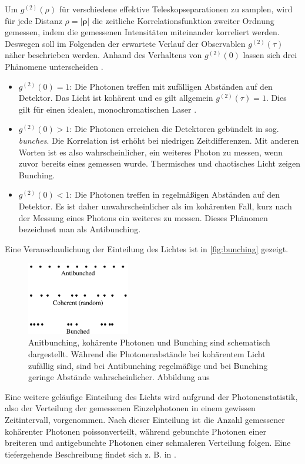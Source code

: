 Um $g^{(2)}(\rho)$ für verschiedene effektive Teleskopseparationen zu samplen, wird für jede Distanz $\rho=|\bm{\rho}|$ die zeitliche Korrelationsfunktion zweiter Ordnung gemessen, indem die gemessenen Intensitäten miteinander korreliert werden. 
Deswegen soll im Folgenden der erwartete Verlauf der Observablen $g^{(2)}(\tau)$ näher beschrieben werden. 
Anhand des Verhaltens von $g^{(2)}(0)$ lassen sich drei Phänomene unterscheiden \cite{foxQuantumOpticsIntroduction2006}. 
\begin{itemize}
    \item $g^{(2)}(0)=1$: Die Photonen treffen mit zufälligen Abständen auf den Detektor. Das Licht ist kohärent und es gilt allgemein $g^{(2)}(\tau)=1$. Dies gilt für einen idealen, monochromatischen Laser \cite[Kap. 9]{mansuripurClassicalOpticsIts2009}.
    \item $g^{(2)}(0)>1$: Die Photonen erreichen die Detektoren gebündelt in sog. \emph{bunches}. Die Korrelation ist erhöht bei niedrigen Zeitdifferenzen. Mit anderen Worten ist es also wahrscheinlicher, ein weiteres Photon zu messen, wenn zuvor bereits eines gemessen wurde. Thermisches und chaotisches Licht zeigen Bunching.
    \item $g^{(2)}(0)<1$: Die Photonen treffen in regelmäßigen Abständen auf den Detektor. Es ist daher unwahrscheinlicher als im kohärenten Fall, kurz nach der Messung eines Photons ein weiteres zu messen. Dieses Phänomen bezeichnet man als Antibunching. 
\end{itemize}
Eine Veranschaulichung der Einteilung des Lichtes ist in \autoref{fig:bunching} gezeigt. 
\begin{figure}[h]
    \centering
    \includegraphics[width=0.4\textwidth]{images/Theorie/Fox_6.6.png}
    \caption{Anitbunching, kohärente Photonen und Bunching sind schematisch dargestellt. Während die Photonenabstände bei kohärentem Licht zufällig sind, sind bei Antibunching regelmäßige und bei Bunching geringe Abstände wahrscheinlicher. Abbildung aus \cite[Abb. 6.6]{foxQuantumOpticsIntroduction2006}}
    \label{fig:bunching}
\end{figure}
Eine weitere geläufige Einteilung des Lichts wird aufgrund der Photonenstatistik, also der Verteilung der gemessenen Einzelphotonen in einem gewissen Zeitintervall, vorgenommen. 
Nach dieser Einteilung ist die Anzahl gemessener kohärenter Photonen poissonverteilt, während gebunchte Photonen einer breiteren und antigebunchte Photonen einer schmaleren Verteilung folgen. 
Eine tiefergehende Beschreibung findet sich z. B. in \cite[Kap. 5.4-5.6]{foxQuantumOpticsIntroduction2006}. \\


